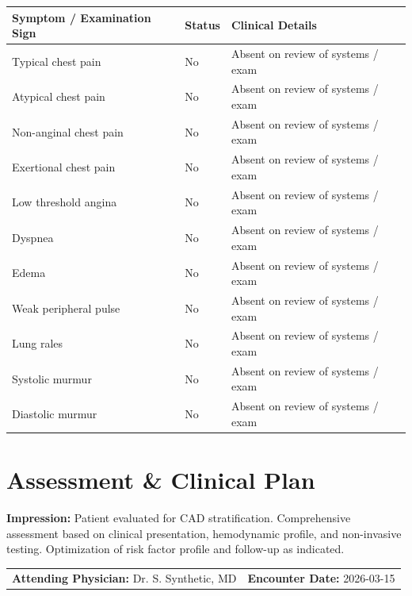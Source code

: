 \documentclass[10pt,a4paper]{article}
\begin{document}
\begin{tabular}{@{} p{6.8cm} p{2.8cm} p{5.5cm} @{}}
  \toprule
  \textbf{Symptom / Examination Sign} & \textbf{Status} & \textbf{Clinical Details} \\
  \midrule
  Typical chest pain & No & Absent on review of systems / exam \\
  Atypical chest pain & No & Absent on review of systems / exam \\
  Non-anginal chest pain & No & Absent on review of systems / exam \\
  Exertional chest pain & No & Absent on review of systems / exam \\
  Low threshold angina & No & Absent on review of systems / exam \\
  Dyspnea & No & Absent on review of systems / exam \\
  Edema & No & Absent on review of systems / exam \\
  Weak peripheral pulse & No & Absent on review of systems / exam \\
  Lung rales & No & Absent on review of systems / exam \\
  Systolic murmur & No & Absent on review of systems / exam \\
  Diastolic murmur & No & Absent on review of systems / exam \\
  \bottomrule
\end{tabular}

\vspace{8pt}

\section*{Assessment \& Clinical Plan}

\noindent
\textbf{Impression:} Patient evaluated for CAD stratification. Comprehensive assessment based on clinical presentation, hemodynamic profile, and non-invasive testing. Optimization of risk factor profile and follow-up as indicated.

\vspace{14pt}

\noindent
\begin{tabular*}{\textwidth}{@{} l @{\extracolsep{\fill}} r @{}}
  \textbf{Attending Physician:} Dr. S. Synthetic, MD & \textbf{Encounter Date:} 2026-03-15 \\
\end{tabular*}
\end{document}
